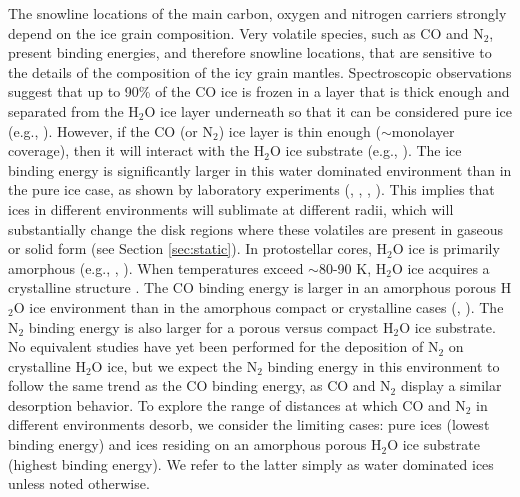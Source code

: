 \documentclass[apj]{emulateapj}
\begin{document}
The snowline locations of the main carbon, oxygen and nitrogen carriers strongly depend on the ice grain composition. Very volatile species, such as CO and N$_2$, present binding energies, and therefore snowline locations, that are sensitive to the details of the composition of the icy grain mantles. 
Spectroscopic observations suggest that up to 90\% of the CO ice is frozen in a layer that is thick enough and separated from the H$_2$O ice layer underneath so that it can be considered pure ice (e.g., \citealt{pontoppidan03}). However, if the CO (or N$_2$) ice layer is thin enough ($\sim$monolayer coverage), then it will interact with the H$_2$O ice substrate (e.g., \citealt{collings03}). The ice binding energy is significantly larger in this water dominated environment than in the pure ice case, as shown by laboratory experiments (\citealt{collings03}, \citealt{oberg05}, \citealt{bisschop06}, \citealt{fayolle16}). %
This implies that ices in different environments will sublimate at different radii, which will substantially change the disk regions where these volatiles are present in gaseous or solid form (see Section \ref{sec:static}).  In protostellar cores, H$_2$O ice is primarily amorphous (e.g., \citealt{williams02}, \citealt{vandishoeck14}).  When temperatures exceed $\sim$80-90 K, H$_2$O ice acquires a crystalline structure \citep{schegerer10}. The CO binding energy is larger in an amorphous porous H$_2$O ice environment than in the amorphous compact or crystalline cases (\citealt{noble12}, \citealt{fayolle16}). The N$_2$ binding energy is also larger for a porous versus compact H$_2$O ice substrate. No equivalent studies have yet been performed for the deposition of N$_2$ on crystalline H$_2$O ice, but we expect the N$_2$ binding energy in this environment to follow the same trend as the CO binding energy, as CO and N$_2$ display a similar desorption behavior. To explore the range of distances at which CO and N$_2$ in different environments desorb, we consider the limiting cases: pure ices (lowest binding energy) and ices residing on an amorphous porous H$_2$O ice substrate (highest binding energy). We refer to the latter simply as water dominated ices unless noted otherwise.
\end{document}
